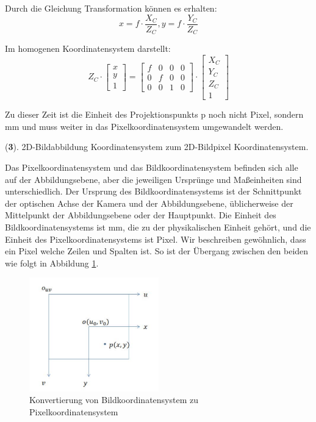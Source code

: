 Durch die Gleichung Transformation können es erhalten: 
\begin{equation}
   x = f \cdot \frac{X_C}{Z_C}, y = f \cdot \frac{Y_C}{Z_C}
\end{equation}

Im homogenen Koordinatensystem darstellt:
\begin{equation}
   Z_C \cdot \begin{bmatrix}
	x \\  
	y \\
	1
	\end{bmatrix} = \begin{bmatrix}
	f & 0 & 0 & 0	\\
	0 & f & 0 & 0	\\
	0 & 0 & 1 & 0	
	\end{bmatrix} \cdot \begin{bmatrix}
	X_C \\  
	Y_C \\
	Z_C \\
	1
	\end{bmatrix}
\end{equation}

Zu dieser Zeit ist die Einheit des Projektionspunkts p noch nicht Pixel, sondern mm und muss weiter in das Pixelkoordinatensystem umgewandelt werden.

(\textbf{3}). 2D-Bildabbildung Koordinatensystem zum 2D-Bildpixel Koordinatensystem.

Das Pixelkoordinatensystem und das Bildkoordinatensystem befinden sich alle auf der Abbildungsebene, aber die jeweiligen Ursprünge und Maßeinheiten sind unterschiedlich. Der Ursprung des Bildkoordinatensystems ist der Schnittpunkt der optischen Achse der Kamera und der Abbildungsebene, üblicherweise der Mittelpunkt der Abbildungsebene oder der Hauptpunkt. Die Einheit des Bildkoordinatensystems ist mm, die zu der physikalischen Einheit gehört, und die Einheit des Pixelkoordinatensystems ist Pixel. Wir beschreiben gewöhnlich, dass ein Pixel welche Zeilen und Spalten ist. So ist der Übergang zwischen den beiden wie folgt in Abbildung \ref{fig:Konvertierung von Pixelkoordinatensystem zu Bildkoordinatensystem}. 

\begin{figure}[H]
 \centering 
 \includegraphics[keepaspectratio,width=0.5\textwidth]{images/3_Ersteverfahren/Kamera/imagezupixel.pdf}
 \caption{Konvertierung von Bildkoordinatensystem zu Pixelkoordinatensystem}
 \label{fig:Konvertierung von Pixelkoordinatensystem zu Bildkoordinatensystem}
\end{figure} 

